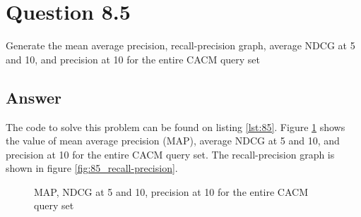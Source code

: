 \documentclass[letterpaper,11pt]{article}
\begin{document}
\noindent\makebox[\linewidth]{\rule{\textwidth}{0.4pt}}

\section*{Question 8.5}
\begin{spverbatim}
Generate the mean average precision, recall-precision graph, average NDCG
at 5 and 10, and precision at 10 for the entire CACM query set
\end{spverbatim}

\subsection*{Answer}
The code to solve this problem can be found on listing \ref{lst:85}. Figure \ref{fig:85_metrics} shows the value of mean average precision (MAP), average NDCG at 5 and 10, and precision at 10 for the entire CACM query set. The recall-precision graph is shown in figure \ref{fig:85_recall-precision}.

\begin{figure}[H]
	\centering
	\caption{MAP, NDCG at 5 and 10, precision at 10 for the entire CACM query set}
	\label{fig:85_metrics}
\end{figure}
\end{document}
